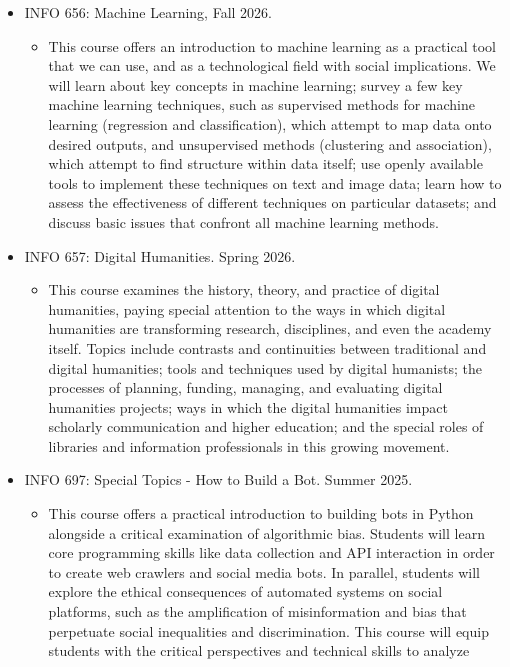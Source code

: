 \documentclass[12pt]{article}
\begin{document}
\begin{itemize}
\item INFO 656: Machine Learning, Fall 2026.
\begin{itemize}
\item This course offers an introduction to machine learning as a
practical tool that we can use, and as a technological field with
social implications. We will learn about key concepts in machine
learning; survey a few key machine learning techniques, such as
supervised methods for machine learning (regression and
classification), which attempt to map data onto desired outputs,
and unsupervised methods (clustering and association), which
attempt to find structure within data itself; use openly available
tools to implement these techniques on text and image data; learn
how to assess the effectiveness of different techniques on
particular datasets; and discuss basic issues that confront all
machine learning methods.
\end{itemize}
\item INFO 657: Digital Humanities. Spring 2026.
\begin{itemize}
\item This course examines the history, theory, and practice of digital
humanities, paying special attention to the ways in which digital
humanities are transforming research, disciplines, and even the
academy itself. Topics include contrasts and continuities between
traditional and digital humanities; tools and techniques used by
digital humanists; the processes of planning, funding, managing,
and evaluating digital humanities projects; ways in which the
digital humanities impact scholarly communication and higher
education; and the special roles of libraries and information
professionals in this growing movement.
\end{itemize}
\item INFO 697: Special Topics - How to Build a Bot. Summer 2025.
\begin{itemize}
\item This course offers a practical introduction to building bots in
Python alongside a critical examination of algorithmic bias.
Students will learn core programming skills like data collection
and API interaction in order to create web crawlers and social
media bots. In parallel, students will explore the ethical
consequences of automated systems on social platforms, such as the
amplification of misinformation and bias that perpetuate social
inequalities and discrimination. This course will equip students
with the critical perspectives and technical skills to analyze

\end{itemize}
\end{itemize}
\end{document}
